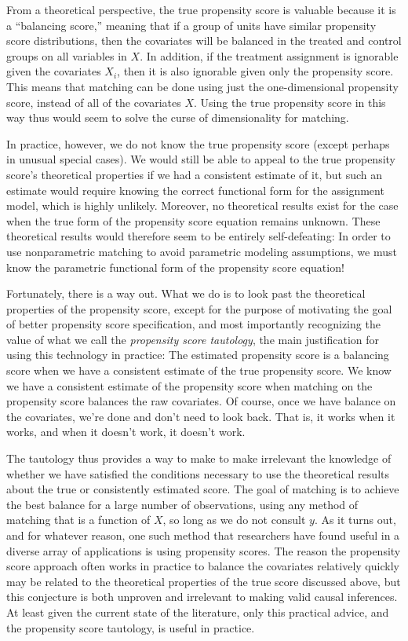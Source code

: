 \documentclass[11pt,titlepage]{article}
\begin{document}
From a theoretical perspective, the true propensity score is valuable
because it is a ``balancing score,'' meaning that if a group of units
have similar propensity score distributions, then the covariates will
be balanced in the treated and control groups on all variables in $X$.
In addition, if the treatment assignment is ignorable given the
covariates $X_i$, then it is also ignorable given only the propensity
score.  This means that matching can be done using just the
one-dimensional propensity score, instead of all of the covariates
$X$.  Using the true propensity score in this way thus would seem to
solve the curse of dimensionality for matching.

In practice, however, we do not know the true propensity score (except
perhaps in unusual special cases).  We would still be able to appeal
to the true propensity score's theoretical properties if we had a
consistent estimate of it, but such an estimate would require knowing
the correct functional form for the assignment model, which is highly
unlikely.  Moreover, no theoretical results exist for the case when
the true form of the propensity score equation remains unknown.  These
theoretical results would therefore seem to be entirely
self-defeating: In order to use nonparametric matching to avoid
parametric modeling assumptions, we must know the parametric
functional form of the propensity score equation!

Fortunately, there is a way out.  What we do is to look past the
theoretical properties of the propensity score, except for the purpose
of motivating the goal of better propensity score specification, and
most importantly recognizing the value of what we call the
\emph{propensity score tautology}, the main justification for using
this technology in practice: The estimated propensity score is a
balancing score when we have a consistent estimate of the true
propensity score.  We know we have a consistent estimate of the
propensity score when matching on the propensity score balances the
raw covariates.  Of course, once we have balance on the covariates,
we're done and don't need to look back.  That is, it works when it
works, and when it doesn't work, it doesn't work.

The tautology thus provides a way to make to make irrelevant the
knowledge of whether we have satisfied the conditions necessary to use
the theoretical results about the true or consistently estimated
score.  The goal of matching is to achieve the best balance for a
large number of observations, using any method of matching that is a
function of $X$, so long as we do not consult $y$.  As it turns out,
and for whatever reason, one such method that researchers have found
useful in a diverse array of applications is using propensity scores.
The reason the propensity score approach often works in practice to
balance the covariates relatively quickly may be related to the
theoretical properties of the true score discussed above, but this
conjecture is both unproven and irrelevant to making valid causal
inferences.  At least given the current state of the literature, only
this practical advice, and the propensity score tautology, is useful
in practice.
\end{document}
